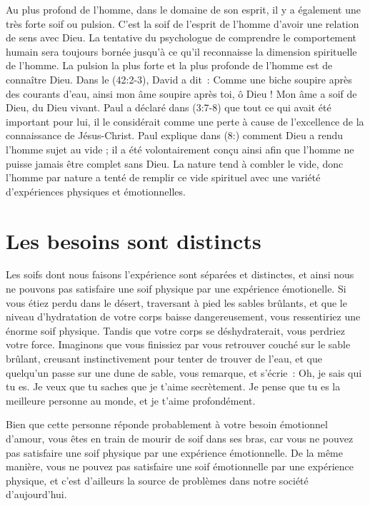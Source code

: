 Au plus profond de l'homme, dans le domaine de son esprit,
 il y a également une très forte soif ou pulsion.
 C'est la soif de l'esprit de l'homme d'avoir une relation de sens avec Dieu.
 La tentative du psychologue de comprendre le comportement humain sera toujours
 bornée jusqu'à ce qu'il reconnaisse la dimension spirituelle de l'homme.
 La pulsion la plus forte et la plus profonde de l'homme est de connaître Dieu.
 Dans le (42:2-3), David a dit~:
 \og Comme une biche soupire après des courants d'eau,
 ainsi mon âme soupire après toi, ô Dieu !
 Mon âme a soif de Dieu, du Dieu vivant. \fg{}
 Paul a déclaré dans (3:7-8) que tout ce qui avait été
 important pour lui, il le considérait comme une perte à cause
 de l'excellence de la connaissance de Jésus-Christ.
 Paul explique dans (8:) comment Dieu a rendu l'homme
 sujet au vide ; il a été volontairement conçu ainsi afin que l'homme
 ne puisse jamais être complet sans Dieu.
 La nature tend à combler le vide, donc l'homme par nature a tenté
 de remplir ce vide spirituel avec une variété d'expériences physiques
 et émotionnelles.


\section*{Les besoins sont distincts}


Les soifs dont nous faisons l'expérience sont séparées et distinctes,
 et ainsi nous ne pouvons pas satisfaire une soif physique
 par une expérience émotionelle. Si vous étiez perdu dans le désert,
 traversant à pied les sables brûlants, et que le niveau d'hydratation
 de votre corps baisse dangereusement, vous ressentiriez une énorme soif
 physique. Tandis que votre corps se déshydraterait,
 vous perdriez votre force. Imaginons que vous finissiez par vous
 retrouver couché sur le sable brûlant, creusant instinctivement
 pour tenter de trouver de l'eau, et que quelqu'un passe sur une dune
 de sable, vous remarque, et s'écrie~:
 \og Oh, je sais qui tu es. Je veux que tu saches que je t'aime secrètement.
 Je pense que tu es la meilleure personne au monde,
 et je t'aime profondément. \fg{}

Bien que cette personne réponde probablement à votre besoin émotionnel
 d'amour, vous êtes en train de mourir de soif dans ses bras,
 car vous ne pouvez pas satisfaire une soif physique par une expérience
 émotionnelle. De la même manière, vous ne pouvez pas satisfaire une soif
 émotionnelle par une expérience physique,
 et c'est d'ailleurs la source de problèmes dans notre société d'aujourd'hui.


